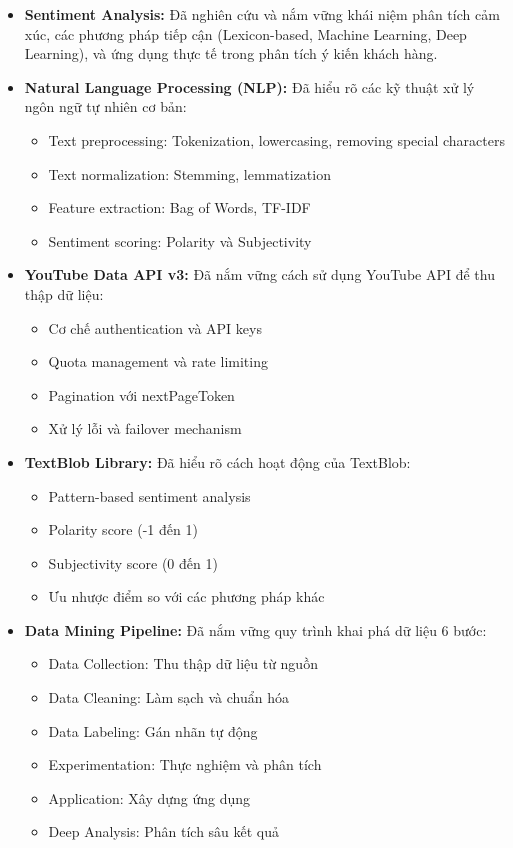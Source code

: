 \begin{itemize}
    \item \textbf{Sentiment Analysis:} Đã nghiên cứu và nắm vững khái niệm phân tích cảm xúc, các phương pháp tiếp cận (Lexicon-based, Machine Learning, Deep Learning), và ứng dụng thực tế trong phân tích ý kiến khách hàng.
    
    \item \textbf{Natural Language Processing (NLP):} Đã hiểu rõ các kỹ thuật xử lý ngôn ngữ tự nhiên cơ bản:
    \begin{itemize}
        \item Text preprocessing: Tokenization, lowercasing, removing special characters
        \item Text normalization: Stemming, lemmatization
        \item Feature extraction: Bag of Words, TF-IDF
        \item Sentiment scoring: Polarity và Subjectivity
    \end{itemize}
    
    \item \textbf{YouTube Data API v3:} Đã nắm vững cách sử dụng YouTube API để thu thập dữ liệu:
    \begin{itemize}
        \item Cơ chế authentication và API keys
        \item Quota management và rate limiting
        \item Pagination với nextPageToken
        \item Xử lý lỗi và failover mechanism
    \end{itemize}
    
    \item \textbf{TextBlob Library:} Đã hiểu rõ cách hoạt động của TextBlob:
    \begin{itemize}
        \item Pattern-based sentiment analysis
        \item Polarity score (-1 đến 1)
        \item Subjectivity score (0 đến 1)
        \item Ưu nhược điểm so với các phương pháp khác
    \end{itemize}
    
    \item \textbf{Data Mining Pipeline:} Đã nắm vững quy trình khai phá dữ liệu 6 bước:
    \begin{itemize}
        \item Data Collection: Thu thập dữ liệu từ nguồn
        \item Data Cleaning: Làm sạch và chuẩn hóa
        \item Data Labeling: Gán nhãn tự động
        \item Experimentation: Thực nghiệm và phân tích
        \item Application: Xây dựng ứng dụng
        \item Deep Analysis: Phân tích sâu kết quả
    \end{itemize}
\end{itemize}

